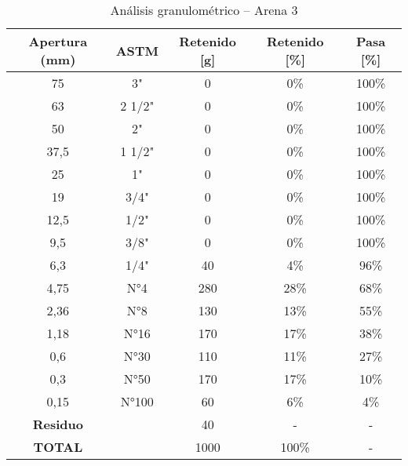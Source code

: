 \begin{table}[H]
\centering
\caption{Análisis granulométrico – Arena 3}
\label{tab:arena3}
\small
\begin{tabular}{|c|c|c|c|c|}
\hline
\textbf{Apertura (mm)} & \textbf{ASTM} & \textbf{Retenido [g]} & \textbf{Retenido [\%]} & \textbf{Pasa [\%]} \\ \hline
75   & 3"      & 0   & 0\%  & 100\% \\ \hline
63   & 2 1/2"  & 0   & 0\%  & 100\% \\ \hline
50   & 2"      & 0   & 0\%  & 100\% \\ \hline
37,5 & 1 1/2"  & 0   & 0\%  & 100\% \\ \hline
25   & 1"      & 0   & 0\%  & 100\% \\ \hline
19   & 3/4"    & 0   & 0\%  & 100\% \\ \hline
12,5 & 1/2"    & 0   & 0\%  & 100\% \\ \hline
9,5  & 3/8"    & 0   & 0\%  & 100\% \\ \hline
6,3  & 1/4"    & 40  & 4\%  & 96\%  \\ \hline
4,75 & N°4     & 280 & 28\% & 68\%  \\ \hline
2,36 & N°8     & 130 & 13\% & 55\%  \\ \hline
1,18 & N°16    & 170 & 17\% & 38\%  \\ \hline
0,6  & N°30    & 110 & 11\% & 27\%  \\ \hline
0,3  & N°50    & 170 & 17\% & 10\%  \\ \hline
0,15 & N°100   & 60  & 6\%  & 4\%   \\ \hline
\textbf{Residuo} &     & 40  & -    & -     \\ \hline
\textbf{TOTAL}  &     & 1000& 100\%& -     \\ \hline
\end{tabular}
\end{table}
